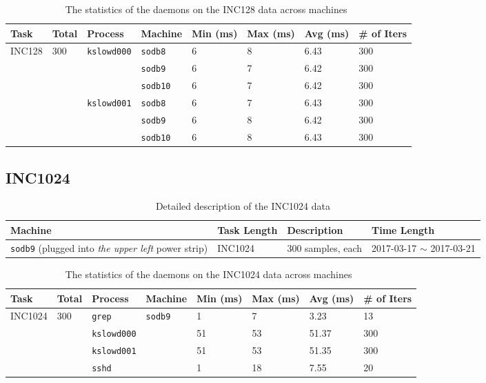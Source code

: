 \documentclass[10pt]{article}
\begin{document}
\begin{table}[H]
\centering
{\small
 \begin{tabular}{|l|l|l|l|l||l|l|l|} \hline
 Task & Total & Process & Machine & Min (ms) & Max (ms) & Avg (ms) & \# of Iters\\ \hline
 INC128 &  300 & {\tt kslowd000} & {\tt sodb8} & 6 & 8 & 6.43 & 300 \\ \hline
 &   &  & {\tt sodb9} & 6 & 7 & 6.42 & 300 \\ \hline
 &   &  & {\tt sodb10} & 6 & 7 & 6.42 & 300 \\ \hline 
 \hline
  &  & {\tt kslowd001} & {\tt sodb8} & 6 & 7 & 6.43 & 300 \\ \hline
 &   &  & {\tt sodb9} & 6 & 8 & 6.42 & 300 \\ \hline
 &   &  & {\tt sodb10} & 6 & 8 & 6.43 & 300 \\ \hline 
 \end{tabular}
  }
 \caption{The statistics of the daemons on the INC128 data across machines~\label{tab:inc128}}
\end{table}

\subsection{INC1024} 

\begin{table}[h]
\begin{center}
\begin{tabular}{|p{4cm}|p{3cm}|p{4cm}|p{4cm}|} \hline
Machine & Task Length & Description & Time Length\\ \hline
{\tt sodb9} (plugged into {\em the upper left} power strip) & INC1024 & 300 samples, each & 2017-03-17 $\sim$ 2017-03-21  \\ \hline
\end{tabular}
\end{center}
\vspace{-.2in}
\caption{Detailed description of the INC1024 data \label{tab:exp_notes1024}}
\end{table}

\begin{table}[htp!]
\centering
{\small
 \begin{tabular}{|l|l|l|l|l||l|l|l|} \hline
 Task & Total & Process & Machine & Min (ms) & Max (ms) & Avg (ms) & \# of Iters\\ \hline
 INC1024 &  300 & {\tt grep} & {\tt sodb9} & 1 & 7 & 3.23 & 13 \\ \hline
 \hline
  &   & {\tt kslowd000} &  & 51 & 53 & 51.37 & 300 \\ \hline
 \hline
  &  & {\tt kslowd001} &  & 51 & 53 & 51.35 & 300 \\ \hline
 \hline
  &  & {\tt sshd} & & 1 & 18 & 7.55 & 20 \\ \hline
 \end{tabular}
  }
 \caption{The statistics of the daemons on the INC1024 data across machines~\label{tab:inc1024}}
\end{table}
\end{document}
